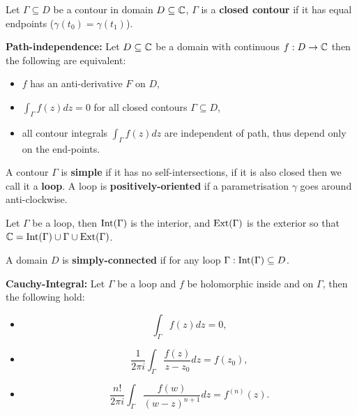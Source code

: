 \begin{multicols}{2}
\begin{definition}
Let $\Gamma\subseteq D$ be a contour in domain $D\subseteq\mathbb{C}$, $\Gamma$ is a \textbf{closed contour} if it has equal endpoints ($\gamma(t_0)=\gamma(t_1)$).
\end{definition}

\begin{theorem}
\textbf{Path-independence:} Let $D\subseteq\mathbb{C}$ be a domain with continuous $f:D\to\mathbb{C}$ then the following are equivalent:
\begin{itemize}
    \item{$f$ has an anti-derivative $F$ on $D$,}
    \item{$\int_\Gamma f(z)dz=0$ for all closed contours $\Gamma\subseteq D$,}
    \item{all contour integrals $\int_\Gamma f(z)dz$ are independent of path, thus depend only on the end-points.}
\end{itemize}
\end{theorem}

\begin{definition}
A contour $\Gamma$ is \textbf{simple} if it has no self-intersections, if it is also closed then we call it a \textbf{loop}. A loop is \textbf{positively-oriented} if a parametrisation $\gamma$ goes around anti-clockwise.
\end{definition}

\begin{definition}
Let $\Gamma$ be a loop, then $\mathrm{Int}(\Gamma)$ is the interior, and $\mathrm{Ext}(\Gamma)$ is the exterior so that $\mathbb{C}=\mathrm{Int}(\Gamma)\cup\Gamma\cup\mathrm{Ext}(\Gamma)$.
\end{definition}

\begin{definition}
A domain $D$ is \textbf{simply-connected} if for any loop $\Gamma: \mathrm{Int}(\Gamma)\subseteq D$.
\end{definition}

\begin{theorem}
\textbf{Cauchy-Integral:} Let $\Gamma$ be a loop and $f$ be holomorphic inside and on $\Gamma$, then the following hold:
\begin{itemize}
    \item{ 
      \[
      \int_\Gamma f(z) dz = 0,
      \]}
    \item{ 
      \[
      \frac{1}{2\pi i}\int_\Gamma \frac{f(z)}{z-z_0} dz = f(z_0),
      \]}
    \item{ 
      \[
      \frac{n!}{2\pi i}\int_\Gamma \frac{f(w)}{(w-z)^{n+1}} dz = f^{(n)}(z).
      \]}
\end{itemize}
\end{theorem}


\end{multicols}
